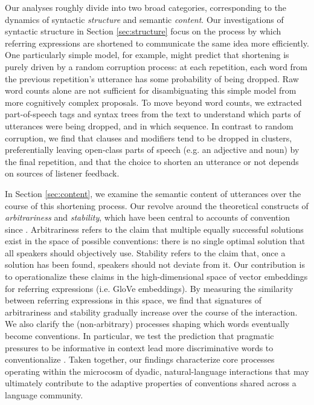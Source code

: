\documentclass[alpha-refs]{wiley-article}
\newcommand{\ndg}[1]{\textcolor{green}{[ndg: #1]}}
\begin{document}
Our analyses roughly divide into two broad categories, corresponding to the dynamics of syntactic \emph{structure} and semantic \emph{content}.
Our investigations of syntactic structure in Section \ref{sec:structure} focus on the process by which referring expressions are shortened to communicate the same idea more efficiently.
One particularly simple model, for example, might predict that shortening is purely driven by a random corruption process: at each repetition, each word from the previous repetition's utterance has some probability of being dropped.
Raw word counts alone are not sufficient for disambiguating this simple model from more cognitively complex proposals.
To move beyond word counts, we extracted part-of-speech tags and syntax trees from the text to understand which parts of utterances were being dropped, and in which sequence.
In contrast to random corruption, we find that clauses and modifiers tend to be dropped in clusters, preferentially leaving open-class parts of speech (e.g. an adjective and noun) by the final repetition, and that the choice to shorten an utterance or not depends on sources of listener feedback.  %

In Section \ref{sec:content}, we examine the semantic content of utterances over the course of this shortening process.
Our revolve around the theoretical constructs of \emph{arbitrariness} and \emph{stability}, which have been central to accounts of convention since \cite{Lewis69_Convention}.
Arbitrariness refers to the claim that multiple equally successful solutions exist in the space of possible conventions: there is no single optimal solution that all speakers should objectively use.
Stability refers to the claim that, once a solution has been found, speakers should not deviate from it.
Our contribution is to operationalize these claims in the high-dimensional space of vector embeddings for referring expressions (i.e. GloVe embeddings).
By measuring the similarity between referring expressions in this space, we find that signatures of arbitrariness and stability gradually increase over the course of the interaction.
We also clarify the (non-arbitrary) processes shaping which words eventually become conventions.
In particular, we test the prediction that pragmatic pressures to be informative in context lead more discriminative words to conventionalize \citep{KirbyTamarizCornishSmith15_CompressionCommunication,GibsonEtAl17_ColorNamingUse,hawkins_emerging_abstractions_2018}. 
Taken together, our findings characterize core processes operating within the microcosm of dyadic, natural-language interactions that may ultimately contribute to the adaptive properties of conventions shared across a language community.
\end{document}
